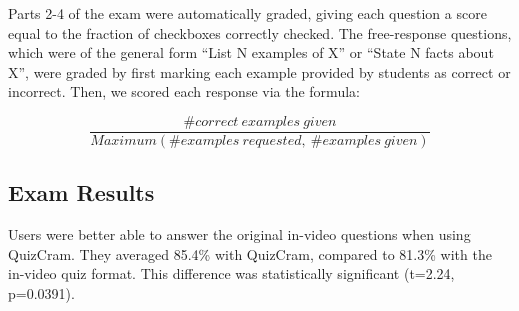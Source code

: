 \documentclass{chi-ext}
\begin{document}
Parts 2-4 of the exam were automatically graded, giving each question a score equal to the fraction of checkboxes correctly checked. The free-response questions, which were of the general form ``List N examples of X'' or ``State N facts about X'', were graded by first marking each example provided by students as correct or incorrect. %
Then, we scored each response via the formula:


\vspace{-4mm}

\[ \frac{\# correct\ examples\ given}{Maximum(\# examples\ requested,\ \# examples\ given)} \]



\subsection{Exam Results}


Users were better able to answer the original in-video questions when using QuizCram. They averaged 85.4\% with QuizCram, compared to 81.3\% with the in-video quiz format. This difference was statistically significant (t=2.24, p=0.0391). %
\end{document}
